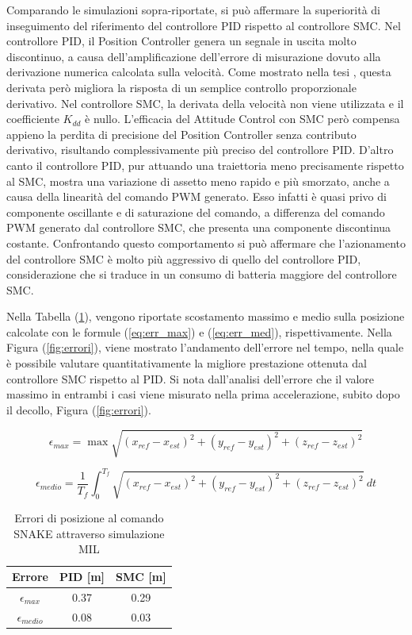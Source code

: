 Comparando le simulazioni sopra-riportate, si può affermare la superiorità di inseguimento del riferimento del controllore PID rispetto al controllore SMC. Nel controllore PID, il Position Controller genera un segnale in uscita molto discontinuo, a causa dell'amplificazione dell'errore di misurazione dovuto alla derivazione numerica calcolata sulla velocità. Come mostrato nella tesi \cite{DesTestCarm}, questa derivata però migliora la risposta di un semplice controllo proporzionale derivativo. Nel controllore SMC, la derivata della velocità non viene utilizzata e il coefficiente $K_{dd}$ è nullo. L'efficacia del Attitude Control con SMC però compensa appieno la perdita di precisione del Position Controller senza contributo derivativo, risultando complessivamente più preciso del controllore PID. D'altro canto il controllore PID, pur attuando una traiettoria meno precisamente rispetto al SMC, mostra una variazione di assetto meno rapido e più smorzato, anche a causa della linearità del comando PWM generato. Esso infatti è quasi privo di componente oscillante e di saturazione del comando, a differenza del comando PWM generato dal controllore SMC, che presenta una componente discontinua costante. Confrontando questo comportamento si può affermare che l'azionamento del controllore SMC è molto più aggressivo di quello del controllore PID, considerazione che si traduce in un consumo di batteria maggiore del controllore SMC.

Nella Tabella (\ref{tab:ConfrontoPIDSMCSIL}), vengono riportate scostamento massimo e medio sulla posizione calcolate con le formule (\ref{eq:err_max}) e (\ref{eq:err_med}), rispettivamente. Nella Figura (\ref{fig:errori}), viene mostrato l'andamento dell'errore nel tempo, nella quale è possibile valutare quantitativamente la migliore prestazione ottenuta dal controllore SMC rispetto al PID. Si nota dall'analisi dell'errore che il valore massimo in entrambi i casi viene misurato nella prima accelerazione, subito dopo il decollo, Figura (\ref{fig:errori}).

\begin{equation}\label{eq:err_max}
\epsilon_{max} = \max \sqrt{(x_{ref}-x_{est})^2+(y_{ref}-y_{est})^2+(z_{ref}-z_{est})^2}
\end{equation}

\begin{equation}\label{eq:err_med}
\epsilon_{medio} = \frac{1}{T_f}\int_{0}^{T_f} \sqrt{(x_{ref}-x_{est})^2+(y_{ref}-y_{est})^2+(z_{ref}-z_{est})^2} \ dt
\end{equation}

\begin{table}
	\centering
	\caption{Errori di posizione al comando SNAKE attraverso simulazione MIL}
	\begin{tabular}{c c c}
		\hline
		Errore &  PID [m] & SMC [m] \\
		\hline
		 $\epsilon_{max}$ & 0.37 & 0.29  \\
		 $\epsilon_{medio}$ & 0.08 & 0.03  \\
		\hline
	\end{tabular}	
	\label{tab:ConfrontoPIDSMCSIL}
\end{table}


